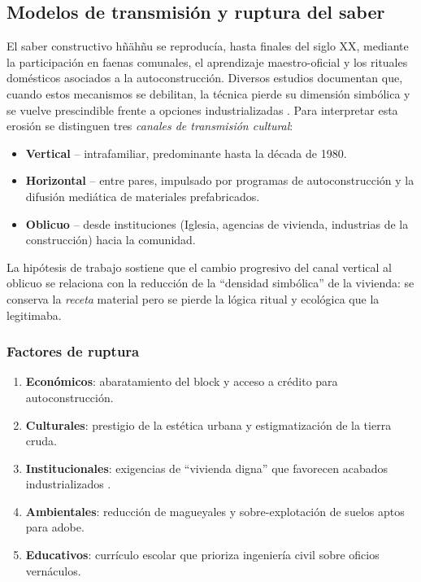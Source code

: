 \subsection{Modelos de transmisión y ruptura del saber}
\label{subsec:modelos_transmision}

El saber constructivo hñähñu se reproducía, hasta finales del siglo XX,
mediante la participación en faenas comunales, el aprendizaje
maestro-oficial y los rituales domésticos asociados a la
autoconstrucción.  Diversos estudios documentan que, cuando estos
mecanismos se debilitan, la técnica pierde su dimensión simbólica y se
vuelve prescindible frente a opciones industrializadas
\citep{torres2021transmision,gandara2000}.  Para interpretar esta
erosión se distinguen tres \emph{canales de transmisión cultural}:

\begin{itemize}
	\item \textbf{Vertical} – intrafamiliar, predominante hasta la década
	      de 1980.
	\item \textbf{Horizontal} – entre pares, impulsado por programas de
	      autoconstrucción y la difusión mediática de materiales
	      prefabricados.
	\item \textbf{Oblicuo} – desde instituciones (Iglesia, agencias de
	      vivienda, industrias de la construcción) hacia la comunidad.
\end{itemize}

La hipótesis de trabajo sostiene que el cambio progresivo del
canal vertical al oblicuo se relaciona con la reducción de la ``densidad
simbólica'' de la vivienda: se conserva la \emph{receta} material pero se
pierde la lógica ritual y ecológica que la legitimaba.

\subsubsection*{Factores de ruptura}

\begin{enumerate}
	\item \textbf{Económicos}: abaratamiento del block y acceso a crédito
	      para autoconstrucción.
	\item \textbf{Culturales}: prestigio de la estética urbana y
	      estigmatización de la tierra cruda.
	\item \textbf{Institucionales}: exigencias de “vivienda digna” que
	      favorecen acabados industrializados \citep{herrejon2006patrimonio}.
	\item \textbf{Ambientales}: reducción de magueyales y sobre-explotación
	      de suelos aptos para adobe.
	\item \textbf{Educativos}: currículo escolar que prioriza ingeniería
	      civil sobre oficios vernáculos.
\end{enumerate}

